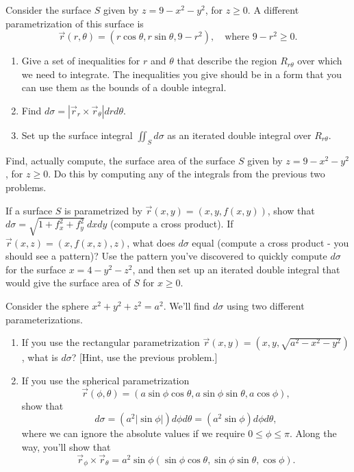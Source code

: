 \begin{problem}
 Consider the surface $S$ given by $z=9-x^2-y^2$, for $z\geq 0$. A different parametrization of this surface is $$\vec r(r,\theta) = (r\cos\theta,r\sin\theta,9-r^2),\quad \text{where } 9-r^2\geq 0.$$ 
\begin{enumerate}
 \item Give a set of inequalities for $r$ and $\theta$ that describe the region $R_{r\theta}$ over which we need to integrate. The inequalities you give should be in a form that you can use them as the bounds of a double integral.
 \item Find $d\sigma = \left|\vec r_r\times \vec r_\theta \right|drd\theta$.
 \item Set up the surface integral $\iint_S d\sigma$ as an iterated double integral over $R_{r\theta}$. 
\end{enumerate}
\end{problem}

\begin{problem}
 Find, actually compute, the surface area of the surface $S$ given by $z=9-x^2-y^2$, for $z\geq 0$. Do this by computing any of the integrals from the previous two problems.
\end{problem}

\begin{problem}
 If a surface $S$ is parametrized by $\vec r(x,y) = (x,y,f(x,y))$, show that $d\sigma = \sqrt{1+f_x^2+f_y^2}\ dxdy$ (compute a cross product).  
If $\vec r(x,z) = (x,f(x,z),z)$, what does $d\sigma$ equal (compute a cross product - you should see a pattern)?
Use the pattern you've discovered to quickly compute $d\sigma$ for the surface $x=4-y^2-z^2$, and then set up an iterated double integral that would give the surface area of $S$ for $x\geq 0$. 
\end{problem}


\begin{problem}\label{sphere surface area element}
 Consider the sphere $x^2+y^2+z^2=a^2$.  We'll find $d\sigma$ using two different parameterizations.
 \begin{enumerate}
  \item If you use the rectangular parametrization $\vec r(x,y) = (x,y,\sqrt{a^2-x^2-y^2})$, what is $d\sigma$? [Hint, use the previous problem.] %
  \item {} If you use the spherical parametrization $$\vec r(\phi,\theta) = (a\sin\phi\cos\theta,a\sin\phi\sin\theta,a\cos\phi),$$ show that $$d\sigma = (a^2|\sin\phi|)d\phi d\theta= (a^2\sin\phi) d\phi d\theta,$$ where we can ignore the absolute values if we require $0\leq \phi\leq \pi$. Along the way, you'll show that 
$$ \vec r_\phi\times \vec r_\theta = a^2\sin \phi (\sin\phi\cos\theta,\sin\phi\sin\theta,\cos\phi).$$
 \end{enumerate}
\end{problem}

